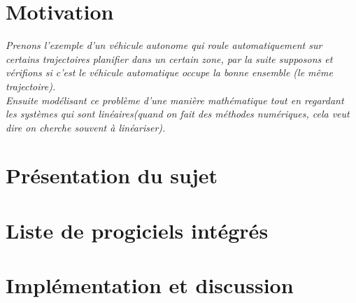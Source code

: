 \documentclass[11pt,a4paper]{article}
\begin{document}
%
%





%
%

\setcounter{page}{1}


\newcommand{\sectionbreak}{\clearpage}

%
%




%
%

\section{Motivation}
{\itshape Prenons l'exemple d'un véhicule autonome qui roule automatiquement sur certains trajectoires planifier dans un certain zone, par la suite  supposons et vérifions si c'est le véhicule automatique occupe la bonne ensemble (le même trajectoire).\\
Ensuite modélisant ce problème d’une manière mathématique tout en regardant les systèmes qui sont linéaires(quand on fait des méthodes numériques, cela veut dire on cherche souvent à linéariser).} 


\section{Pr\'esentation du sujet}






\section{Liste de progiciels int\'egr\'es}




\section{Implémentation et discussion}

\end{document}

